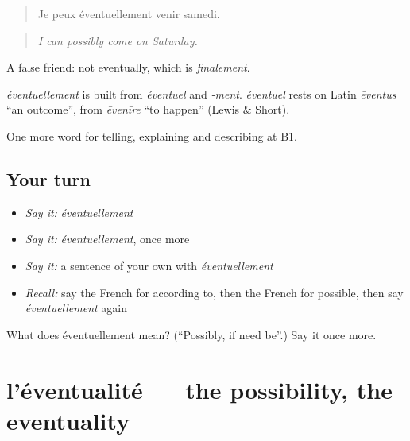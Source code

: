 \begin{quote}
Je peux éventuellement venir samedi.
\end{quote}

\begin{quote}
\emph{I can possibly come on Saturday.}
\end{quote}

A false friend: not eventually, which is \emph{finalement}.

\begin{cousinweb}
\emph{éventuellement} is built from \emph{éventuel} and \emph{-ment}. \emph{éventuel} rests on Latin \emph{ēventus} \textquotedblleft{}an outcome\textquotedblright{}, from \emph{ēvenīre} \textquotedblleft{}to happen\textquotedblright{} (Lewis \& Short).
\end{cousinweb}

\begin{grammarlens}[title={What you've built}]
One more word for telling, explaining and describing at B1.
\end{grammarlens}

\subsection*{Your turn}
\begin{itemize}
\raggedright
  \item \emph{Say it:} \emph{éventuellement}
  \item \emph{Say it:} \emph{éventuellement}, once more
  \item \emph{Say it:} a sentence of your own with \emph{éventuellement}
  \item \emph{Recall:} say the French for according to, then the French for possible, then say \emph{éventuellement} again
\end{itemize}

\begin{tcolorbox}[breakable,colback=teal!4,colframe=teal!35!black,title={Before you move on}]
What does éventuellement mean? (\textquotedblleft{}Possibly, if need be\textquotedblright{}.) Say it once more.
\end{tcolorbox}
\section[l'éventualité]{l'éventualité — the possibility, the eventuality}

\label{lesson:FR-C369-eventualite}



